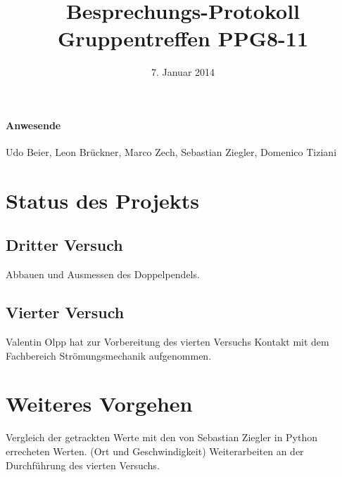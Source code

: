 \documentclass[
]{scrartcl}
\begin{document}
\title{Besprechungs-Protokoll Gruppentreffen PPG8-11}
\date{7. Januar 2014}
\maketitle

\paragraph*{Anwesende}
Udo Beier,
Leon Brückner,
Marco Zech,
Sebastian Ziegler,
Domenico Tiziani


\section{Status des Projekts}


\subsection{Dritter Versuch}
Abbauen und Ausmessen des Doppelpendels.

\subsection{Vierter Versuch}
Valentin Olpp hat zur Vorbereitung des vierten Versuchs Kontakt mit dem Fachbereich Strömungsmechanik aufgenommen.

\section{Weiteres Vorgehen}
Vergleich der getrackten Werte mit den von Sebastian Ziegler in Python errecheten Werten. (Ort und Geschwindigkeit) Weiterarbeiten an der Durchführung des vierten Versuchs.
\end{document}
